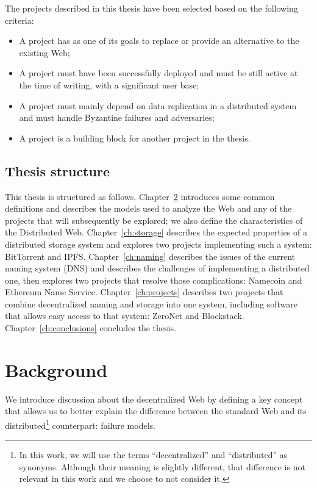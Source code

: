 \documentclass[mscthesis]{usiinfthesis}
\begin{document}
The projects described in this thesis have been selected based on the following criteria:
\begin{itemize}
	\item A project has as one of its goals to replace or provide an alternative to the existing Web;
	\item A project must have been successfully deployed and must be still active at the time of writing, with a significant user base;
	\item A project must mainly depend on data replication in a distributed system and must handle Byzantine failures and adversaries;
	\item A project is a building block for another project in the thesis.
\end{itemize}

\section{Thesis structure}\label{sec:structure}
This thesis is structured as follows. Chapter~\ref{ch:background} introduces some common definitions and describes the models used to analyze the Web and any of the projects that will subsequently be explored; we also define the characteristics of the Distributed Web. Chapter~\ref{ch:storage} describes the expected properties of a distributed storage system and explores two projects implementing such a system: BitTorrent and IPFS. Chapter~\ref{ch:naming} describes the issues of the current naming system (DNS) and describes the challenges of implementing a distributed one, then explores two projects that resolve those complications: Namecoin and Ethereum Name Service. Chapter~\ref{ch:projects} describes two projects that combine decentralized naming and storage into one system, including software that allows easy access to that system: ZeroNet and Blockstack.
Chapter~\ref{ch:conclusions} concludes the thesis.

\chapter{Background}\label{ch:background}

We introduce discussion about the decentralized Web by defining a key concept that allows us to better explain the difference between the standard Web and its distributed\footnote{In this work, we will use the terms ``decentralized'' and ``distributed'' as synonyms. Although their meaning is slightly different, that difference is not relevant in this work and we choose to not consider it.} counterpart: failure models.
\end{document}
